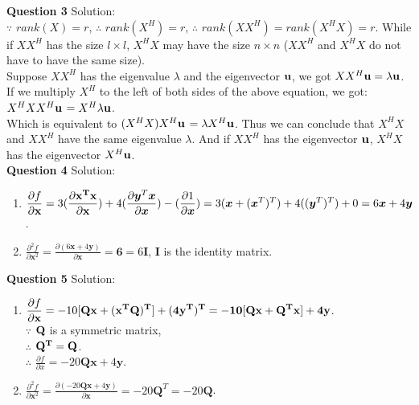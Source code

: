 \documentclass[a4paper]{article}
\begin{document}
\begin{spacing}{2.0}
\huge\textbf{ Question 3}      \Large{Solution:} \\
	\normalsize 
	$\because$ $rank(X) = r$, $\therefore$ $rank(X^H) = r$, $\therefore$ $rank(XX^H) = rank(X^HX) = r$. While if $XX^H$ has the size $l\times l$, $X^HX$ may have the size $n\times n$ ($XX^H$ and $X^HX$ do not have to have the same size).\\
	Suppose $XX^H$ has the eigenvalue $\lambda$ and the eigenvector $\bf{u}$, we got $XX^H\bf{u} = \lambda\bf{u}$. \\
	If we multiply $X^H$ to the left of both sides of the above equation, we got: $X^HXX^H\bf{u}$ $= X^H\lambda\bf{u}$.\\
	Which is equivalent to $(X^HX)X^H\bf{u}$ $= \lambda X^H\bf{u}$. Thus we can conclude that $X^HX$ and $XX^H$ have the same eigenvalue $\lambda$. And if $XX^H$ has the eigenvector $\bf{u}$, $X^HX$ has the eigenvector $X^H\bf{u}$.\\

\huge\textbf{ Question 4}      \Large{Solution:} 
	\normalsize
	\begin{enumerate}
		\item $\displaystyle\frac{\partial f}{\partial \bf{x}} = 3(\displaystyle\frac{\partial \bf{x}^T\bf{x}}{\partial \bf{x}}) +
		4(\displaystyle\frac{\partial \boldsymbol{y}^T\boldsymbol{x}}{\partial \boldsymbol{x}}) - (\displaystyle\frac{\partial 1}{\partial \boldsymbol{x}}) = 3(\boldsymbol{x} + (\boldsymbol{x}^T)^T) + 4((\boldsymbol{y}^T)^T) + 0 = 6\boldsymbol{x} + 4\boldsymbol{y}$.
		
		\item $\displaystyle\frac{\partial^{2} f}{\partial \boldsymbol{x}^2} = \displaystyle\frac{\partial (6\boldsymbol{x}+4\boldsymbol{y})}{\partial \boldsymbol{x}} = \boldsymbol 6 = 6\boldsymbol{I}$, $\boldsymbol{I}$ is the identity matrix.\\
	\end{enumerate}


\huge\textbf{ Question 5}      \Large{Solution:} 
	\normalsize
	\begin{enumerate}
		\item $\displaystyle\frac{\partial f}{\partial \bf{x}} = -10[\bf{Qx} + (\bf{x}^T\bf{Q})^T] + (4\bf{y}^T)^T = -10[\bf{Qx} 
		+ \bf{Q}^T\bf{x}] + 4\bf{y}$.\\
			$\because$ $\bf{Q}$ is a symmetric matrix,\\
			$\therefore$ $\bf{Q^T} = \bf{Q}$.\\
			$\therefore$ $\displaystyle\frac{\partial f}{\partial x} = -20\boldsymbol{Qx} + 4\boldsymbol{y}$.\\
			
		\item $\displaystyle\frac{\partial^{2} f}{\partial \boldsymbol{x}^2} = \displaystyle\frac{\partial (-20\boldsymbol{Qx} + 4\boldsymbol{y})}{\partial 
		\boldsymbol{x}} = -20\boldsymbol{Q}^T = -20\boldsymbol{Q}$.\\
	\end{enumerate} 

\end{spacing}
\end{document}
